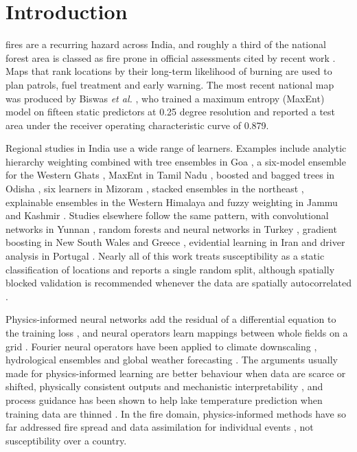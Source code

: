 \documentclass[journal]{IEEEtran}
\begin{document}
\section{Introduction}

 fires are a recurring hazard across India, and roughly a third of the national forest area is classed as fire prone in official assessments cited by recent work \cite{biswas2025}. Maps that rank locations by their long-term likelihood of burning are used to plan patrols, fuel treatment and early warning. The most recent national map was produced by Biswas \emph{et al.} \cite{biswas2025}, who trained a maximum entropy (MaxEnt) model on fifteen static predictors at 0.25 degree resolution and reported a test area under the receiver operating characteristic curve of 0.879.

Regional studies in India use a wide range of learners. Examples include analytic hierarchy weighting combined with tree ensembles in Goa \cite{uthappa2025}, a six-model ensemble for the Western Ghats \cite{kandanaveenbabu2023}, MaxEnt in Tamil Nadu \cite{meraj2025}, boosted and bagged trees in Odisha \cite{guria2025}, six learners in Mizoram \cite{gupta2025}, stacked ensembles in the northeast \cite{sarkar2024}, explainable ensembles in the Western Himalaya \cite{hang2024} and fuzzy weighting in Jammu and Kashmir \cite{malik2025}. Studies elsewhere follow the same pattern, with convolutional networks in Yunnan \cite{zhang2019}, random forests and neural networks in Turkey \cite{kantarcioglu2023,iban2024}, gradient boosting in New South Wales and Greece \cite{zakari2025,symeonidis2025}, evidential learning in Iran \cite{gholamnia2026} and driver analysis in Portugal \cite{santananeto2025}. Nearly all of this work treats susceptibility as a static classification of locations and reports a single random split, although spatially blocked validation is recommended whenever the data are spatially autocorrelated \cite{roberts2017}.

Physics-informed neural networks add the residual of a differential equation to the training loss \cite{raissi2019}, and neural operators learn mappings between whole fields on a grid \cite{li2023pino}. Fourier neural operators have been applied to climate downscaling \cite{jiang2023}, hydrological ensembles \cite{sun2024} and global weather forecasting \cite{kurth2023}. The arguments usually made for physics-informed learning are better behaviour when data are scarce or shifted, physically consistent outputs and mechanistic interpretability \cite{karniadakis2021}, and process guidance has been shown to help lake temperature prediction when training data are thinned \cite{read2019}. In the fire domain, physics-informed methods have so far addressed fire spread and data assimilation for individual events \cite{vogiatzoglou2025,dabrowski2023}, not susceptibility over a country.
\end{document}
